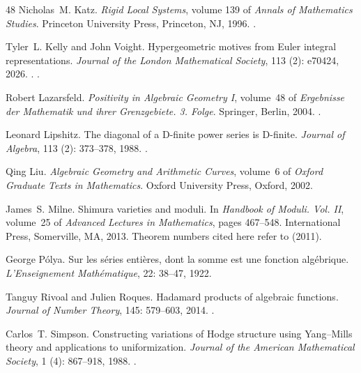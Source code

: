 \documentclass[11pt]{amsart}
\theoremstyle{definition}
\theoremstyle{remark}
\numberwithin{equation}{section}
\begin{document}
\begin{thebibliography}{48}
Nicholas~M. Katz.
\newblock \emph{Rigid Local Systems}, volume 139 of \emph{Annals of Mathematics
  Studies}.
\newblock Princeton University Press, Princeton, NJ, 1996.
\newblock {}.

Tyler~L. Kelly and John Voight.
\newblock Hypergeometric motives from {E}uler integral representations.
\newblock \emph{Journal of the London Mathematical Society}, 113
  (2): e70424, 2026.
\newblock {}.
\newblock {}.

Robert Lazarsfeld.
\newblock \emph{Positivity in Algebraic Geometry {I}}, volume~48 of
  \emph{Ergebnisse der Mathematik und ihrer Grenzgebiete. 3. Folge}.
\newblock Springer, Berlin, 2004.
\newblock {}.

Leonard Lipshitz.
\newblock The diagonal of a {D}-finite power series is {D}-finite.
\newblock \emph{Journal of Algebra}, 113 (2): 373--378, 1988.
\newblock {}.

Qing Liu.
\newblock \emph{Algebraic Geometry and Arithmetic Curves}, volume~6 of
  \emph{Oxford Graduate Texts in Mathematics}.
\newblock Oxford University Press, Oxford, 2002.

James~S. Milne.
\newblock Shimura varieties and moduli.
\newblock In \emph{Handbook of Moduli. {V}ol. {II}}, volume~25 of
  \emph{Advanced Lectures in Mathematics}, pages 467--548. International Press,
  Somerville, MA, 2013.
\newblock Theorem numbers cited here refer to  (2011).

George P{\'o}lya.
\newblock Sur les s{\'e}ries enti{\`e}res, dont la somme est une fonction
  alg{\'e}brique.
\newblock \emph{L'Enseignement Math{\'e}matique}, 22: 38--47, 1922.

Tanguy Rivoal and Julien Roques.
\newblock Hadamard products of algebraic functions.
\newblock \emph{Journal of Number Theory}, 145: 579--603, 2014.
\newblock {}.

Carlos~T. Simpson.
\newblock Constructing variations of {H}odge structure using {Y}ang--{M}ills
  theory and applications to uniformization.
\newblock \emph{Journal of the American Mathematical Society}, 1
  (4): 867--918, 1988.
\newblock {}.


\end{thebibliography}
\end{document}
